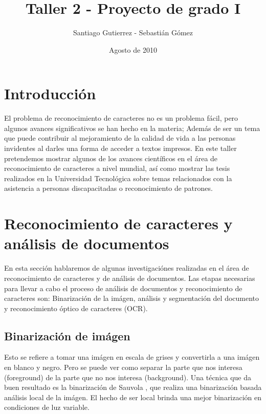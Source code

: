\documentclass{article}
\begin{document}
\title {Taller 2 - Proyecto de grado I}
\author { Santiago Gutierrez - Sebastián Gómez }
\date {Agosto de 2010}
\maketitle

	\section{Introducción}
	El problema de reconocimiento de caracteres no es un problema fácil, pero algunos
	avances significativos se han hecho en la materia; Además de ser un tema que puede
	contribuir al mejoramiento de la calidad de vida a las personas invidentes al darles
	una forma de acceder a textos impresos.
	En este taller pretendemos mostrar algunos de los avances científicos en el área
	de reconocimiento de caracteres a nivel mundial, así como mostrar las tesis
	realizados en la Universidad Tecnológica sobre temas relacionados con la asistencia
	a personas discapacitadas o reconocimiento de patrones.
	
	\section{Reconocimiento de caracteres y análisis de documentos}
	En esta sección hablaremos de algunas investigaciónes realizadas en el área
	de reconocimiento de caracteres y de análisis de documentos.
	Las etapas necesarias para llevar a cabo el proceso de análisis de documentos
	y reconocimiento de caracteres son: Binarización de la imágen, análisis y
	segmentación del documento y reconocimiento óptico de caracteres (OCR).
	
	\subsection{Binarización de imágen}
	Esto se refiere a tomar una imágen en escala de grises y convertirla a una 
	imágen en blanco y negro. Pero se puede ver como separar la parte que nos interesa
	(foreground) de la parte que no nos interesa (background).
	Una técnica que da buen resultado es la binarización de Sauvola \cite{ocropus2},
	que realiza una binarización basada análisis local de la imágen. El hecho de
	ser local brinda una mejor binarización en condiciones de luz variable.
	
\end{document}
